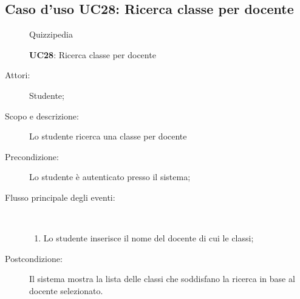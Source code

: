\subsection{Caso d'uso UC28: Ricerca classe per docente}
	\begin{figure}[H]
		\centering
		\begin{resizedtikzpicture}{\textwidth}
		\begin{umlsystem}[x=0, fill=lightgray!20]{Quizzipedia}
		\end{umlsystem}
		\end{resizedtikzpicture}
		\caption{\textbf{UC28}: Ricerca classe per docente}
		\label{UC28}
	\end{figure}
\begin{description}
\item[Attori:] Studente;
\item[Scopo e descrizione:] Lo studente ricerca una classe per docente
      \item[Precondizione:] Lo studente è autenticato presso il sistema;

        \item[Flusso principale degli eventi:] \ 
 \begin{enumerate}
          \item Lo studente inserisce il nome del docente di cui le classi;

      \end{enumerate}
    \item[Postcondizione:] Il sistema mostra la lista delle classi che soddisfano la ricerca in base al docente selezionato.
  \end{description}
\hypertarget{UC29}{}
